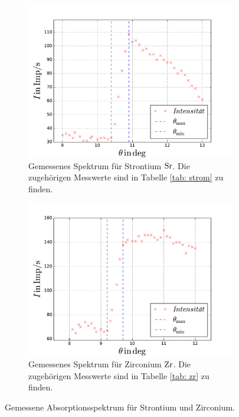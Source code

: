 \begin{figure}
  \centering
  \begin{subfigure}{0.48\textwidth}
    \centering
    \includegraphics[width=1 \textwidth]{../Messdaten/strom.pdf}
    \caption{Gemessenes Spektrum für Strontium $\ce{Sr}$. Die zugehörigen Messwerte sind in Tabelle \ref{tab: strom} zu finden.}
    \label{fig: frank_hertz}
  \end{subfigure}
  \begin{subfigure}{0.48\textwidth}
    \centering
    \includegraphics[width=1 \textwidth]{../Messdaten/zr.pdf}
    \caption{Gemessenes Spektrum für Zirconium $\ce{Zr}$. Die zugehörigen Messwerte sind in Tabelle \ref{tab: zr} zu finden.  } %
    \label{fig: enrgie_hot}
  \end{subfigure}
  \caption{Gemessene Absorptionsspektrum für Strontium und Zirconium.}
  \label{fig: spektrum_strontium_zirconium}
\end{figure}
